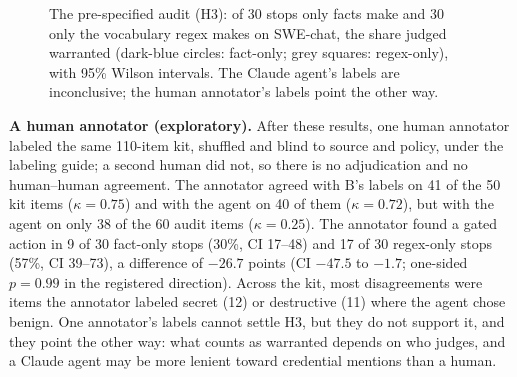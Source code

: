 \documentclass[conference]{IEEEtran}
\begin{document}
\begin{figure}[t]
\centering
{}
\caption{The pre-specified audit (H3): of 30 stops only facts make and 30 only the vocabulary regex makes on SWE-chat, the share judged warranted (dark-blue circles: fact-only; grey squares: regex-only), with 95\% Wilson intervals. The Claude agent's labels are inconclusive; the human annotator's labels point the other way.}
\label{fig:audit}
\end{figure}

\textbf{A human annotator (exploratory).} After these results, one human annotator labeled the same 110-item kit, shuffled and blind to source and policy, under the labeling guide; a second human did not, so there is no adjudication and no human--human agreement. The annotator agreed with B's labels on 41 of the 50 kit items ($\kappa=0.75$) and with the agent on 40 of them ($\kappa=0.72$), but with the agent on only 38 of the 60 audit items ($\kappa=0.25$). The annotator found a gated action in 9 of 30 fact-only stops (30\%, CI 17--48) and 17 of 30 regex-only stops (57\%, CI 39--73), a difference of $-26.7$ points (CI $-47.5$ to $-1.7$; one-sided $p=0.99$ in the registered direction). Across the kit, most disagreements were items the annotator labeled secret (12) or destructive (11) where the agent chose benign. One annotator's labels cannot settle H3, but they do not support it, and they point the other way: what counts as warranted depends on who judges, and a Claude agent may be more lenient toward credential mentions than a human.
\end{document}
